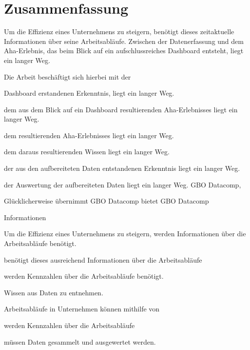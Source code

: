 \chapter*{Zusammenfassung}
\label{chap:zusammenfassung}

Um die Effizienz eines Unternehmens zu steigern, benötigt dieses zeitaktuelle Informationen über seine Arbeitsabläufe.
Zwischen der Datenerfassung und dem Aha-Erlebnis, das beim Blick auf ein aufschlussreiches Dashboard entsteht, liegt ein
langer Weg. 


Die Arbeit beschäftigt sich hierbei mit der 


Dashboard erstandenen Erkenntnis, liegt ein langer Weg.



dem aus dem Blick auf ein Dashboard resultierenden Aha-Erlebnisses liegt ein langer Weg.


dem resultierenden Aha-Erlebnisses liegt ein langer Weg.


dem daraus resultierenden Wissen liegt ein langer Weg.


der aus den aufbereiteten Daten entstandenen Erkenntnis liegt ein langer Weg.


der Auswertung der aufbereiteten Daten liegt ein langer Weg. GBO Datacomp,




Glücklicherweise
übernimmt GBO Datacomp 
bietet GBO Datacomp 


Informationen

Um die Effizienz eines Unternehmens zu steigern, werden Informationen über die Arbeitsabläufe benötigt.



benötigt dieses ausreichend Informationen über die Arbeitsabläufe


werden Kennzahlen über die Arbeitsabläufe benötigt.

Wissen aus Daten zu entnehmen.

Arbeitsabläufe in Unternehmen können mithilfe von 

 werden Kennzahlen über die Arbeitsabläufe 



müssen Daten gesammelt und ausgewertet werden.
